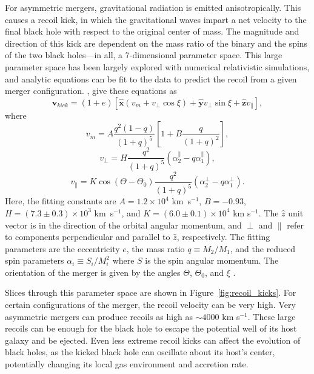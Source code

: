 For asymmetric mergers, gravitational radiation is emitted anisotropically.  This causes a recoil kick, in which the gravitational waves impart a net velocity to the final black hole with respect to the original center of mass.  The magnitude and direction of this kick are dependent on the mass ratio of the binary and the spins of the two black holes---in all, a 7-dimensional parameter space.  This large parameter space has been largely explored with numerical relativistic simulations, and analytic equations can be fit to the data to predict the recoil from a given merger configuration.  \citet{holley-bockelmann_2008}, give these equations as
\begin{equation} \label{eq:v_kick}
  \mathbf{v}_{kick} = \left(1+e\right)\left[\mathbf{\hat{x}}\left(v_{m} + v_{\perp} \cos\xi\right) + \mathbf{\hat{y}}v_{\perp}\sin\xi + \mathbf{\hat{z}}v_{\parallel}\right],
\end{equation}
where 
\begin{equation} \label{eq:v_m}
  v_{m} = A \frac{q^{2}(1-q)}{(1+q)^{5}} \left[1 + B \frac{q}{(1+q)^{2}}\right],
\end{equation}
\begin{equation} \label{eq:v_perp}
  v_{\perp} = H \frac{q^{2}}{\left(1+q\right)^{5}} \left(\alpha_{2}^{\parallel} - q\alpha_{1}^{\parallel}\right),
\end{equation}
\begin{equation} \label{eq:v_parallel}
  v_{\parallel} = K \cos\left(\Theta - \Theta_{0}\right) \frac{q^{2}}{\left(1+q\right)^{5}} \left(\alpha_{2}^{\perp} - q\alpha_{1}^{\perp}\right).
\end{equation}
Here, the fitting constants are $A = 1.2 \times 10^{4}$ km~s$^{-1}$, $B = -0.93$, $H = (7.3 \pm 0.3) \times 10^{3}$ km~s$^{-1}$, and  $K = (6.0 \pm 0.1) \times 10^{4}$ km s$^{-1}$.  The $\hat{z}$ unit vector is in the direction of the orbital angular momentum, and $\perp$ and $\parallel$ refer to components perpendicular and parallel to $\hat{z}$, respectively.  The fitting parameters are the eccentricity $e$, the mass ratio $q \equiv M_{2}/M_{1}$, and the reduced spin parameters $\alpha_{i} \equiv S_{i}/M_{i}^{2}$ where $S$ is the spin angular momentum.  The orientation of the merger is given by the angles $\Theta$, $\Theta_{0}$, and $\xi$ \citep{holley-bockelmann_2008}.

Slices through this parameter space are shown in Figure~\ref{fig:recoil_kicks}.  For certain configurations of the merger, the recoil velocity can be very high.  Very asymmetric mergers can produce recoils as high as $\sim 4000$ km s$^{-1}$.  These large recoils can be enough for the black hole to escape the potential well of its host galaxy and be ejected.  Even less extreme recoil kicks can affect the evolution of black holes, as the kicked black hole can oscillate about its host's center, potentially changing its local gas environment and accretion rate.

